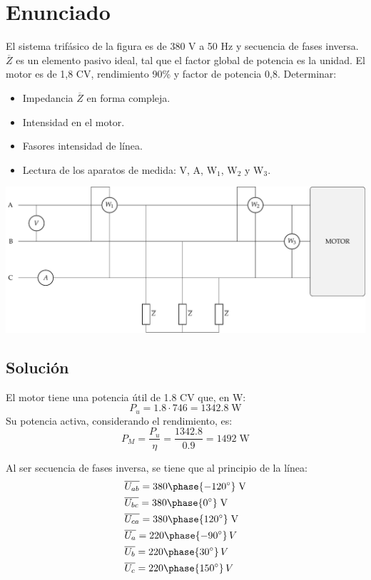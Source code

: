 \section{Enunciado}
 
El sistema trifásico de la figura es de 380 V a 50 Hz y secuencia de fases inversa. $\overline{Z}$ es un elemento pasivo ideal, tal que el factor global de potencia es la unidad. El motor es de 1,8 CV, rendimiento 90\% y factor de potencia 0,8. Determinar:
\begin{itemize}
    \item  Impedancia $\overline{Z}$ en forma compleja.
    \item  Intensidad en el motor.
    \item  Fasores intensidad de línea.
    \item  Lectura de los aparatos de medida: V, A, W$_1$, W$_2$ y W$_3$.
\end{itemize}
\begin{center}
  \includegraphics[width=\linewidth]{figuras/ej7_BT3.pdf}
\end{center}

\subsection*{Solución}
El motor tiene una potencia útil de 1.8 CV que, en W:
\begin{equation*}
  P_u=1.8\cdot 746=1342.8\;\text{W}    
\end{equation*}
Su potencia activa, considerando el rendimiento, es:
\begin{equation*}
  P_M=\dfrac{P_u}{\eta}=\dfrac{1342.8}{0.9}=1492\;\text{W}
\end{equation*} 


Al ser secuencia de fases inversa, se tiene que al principio de la
línea:
\begin{align*}
  &\overline{U_{ab}}=380\phase{-120^\circ}\;\text{V} \\
  &\overline{U_{bc}}=380\phase{0^\circ}\;\text{V} \\
  &\overline{U_{ca}}=380\phase{120^\circ}\;\text{V}  \\
  &\overline{U_a}=220\phase{-90^\circ}\,V\\
  &\overline{U_b}=220\phase{30^\circ}\,V\\
  &\overline{U_c}=220\phase{150^\circ}\,V
\end{align*}

